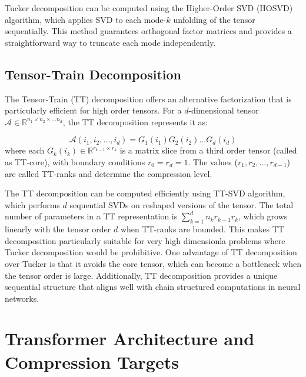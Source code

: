 \documentclass[conference]{IEEEtran}
\begin{document}
Tucker decomposition can be computed using the Higher-Order SVD (HOSVD) algorithm, which applies SVD to each mode-$k$ unfolding
of the tensor sequentially. This method guarantees orthogonal factor matrices and provides a straightforward way to truncate each
mode independently.

\subsection{Tensor-Train Decomposition}
The Tensor-Train (TT) decomposition offers an alternative factorization that is particularly efficient for high order tensors.
For a $d$-dimensional tensor $\mathcal{A} \in \mathbb{R}^{n_1 \times n_2 \times \ldots n_d}$, the TT decomposition represents it as:

\[
    \mathcal{A}(i_1, i_2, \ldots, i_d) = G_1(i_1) G_2(i_2) \ldots G_d(i_d)
\]
where each $G_k(i_k) \in \mathbb{R}^{r_{k-1} \times r_k}$ is a matrix slice from a third order tensor (called as TT-core), with
boundary conditions $r_0 = r_d = 1$. The values ($r_1, r_2, \ldots, r_{d-1}$) are called TT-ranks and determine the compression level.

The TT decomposition can be computed efficiently using TT-SVD algorithm, which performs $d$ sequential SVDs on reshaped versions
of the tensor. The total number of parameters in a TT representation is $\sum_{k=1}^{d} n_k r_{k-1} r_k$, which grows linearly
with the tensor order $d$ when TT-ranks are bounded. This makes TT decomposition particularly suitable for very high dimensionla
problems where Tucker decomposition would be prohibitive. One advantage of TT decomposition over Tucker is that it avoids the core
tensor, which can become a bottleneck when the tensor order is large. Additionally, TT decomposition provides a unique sequential
structure that aligns well with chain structured computations in neural networks.



\section{Transformer Architecture and Compression Targets}

\end{document}
